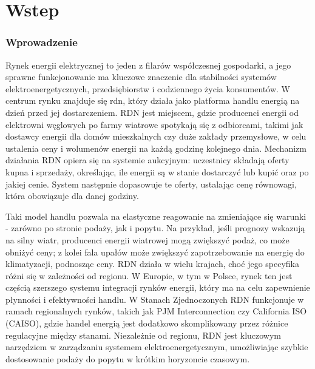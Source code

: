 \chapter{Wstep}

\subsection*{Wprowadzenie}
\label{ch:wprowadzenie}
Rynek energii elektrycznej to jeden z filarów współczesnej gospodarki, a jego sprawne funkcjonowanie ma kluczowe znaczenie dla stabilności systemów elektroenergetycznych, przedsiębiorstw i codziennego życia konsumentów. W centrum rynku znajduje się \gls{rdn}, który działa jako platforma handlu energią na dzień przed jej dostarczeniem. RDN jest miejscem, gdzie producenci energii od elektrowni węglowych po farmy wiatrowe spotykają się z odbiorcami, takimi jak dostawcy energii dla domów mieszkalnych czy duże zakłady przemysłowe, w celu ustalenia ceny i wolumenów energii na każdą godzinę kolejnego dnia. Mechanizm działania RDN opiera się na systemie aukcyjnym: uczestnicy składają oferty kupna i sprzedaży, określając, ile energii są w stanie dostarczyć lub kupić oraz po jakiej cenie. System następnie dopasowuje te oferty, ustalając cenę równowagi, która obowiązuje dla danej godziny.

Taki model handlu pozwala na elastyczne reagowanie na zmieniające się warunki - zarówno po stronie podaży, jak i popytu. Na przykład, jeśli prognozy wskazują na silny wiatr, producenci energii wiatrowej mogą zwiększyć podaż, co może obniżyć ceny; z kolei fala upałów może zwiększyć zapotrzebowanie na energię do klimatyzacji, podnosząc ceny. RDN działa w wielu krajach, choć jego specyfika różni się w zależności od regionu. W Europie, w tym w Polsce, rynek ten jest częścią szerszego systemu integracji rynków energii, który ma na celu zapewnienie płynności i efektywności handlu. W Stanach Zjednoczonych RDN funkcjonuje w ramach regionalnych rynków, takich jak PJM Interconnection czy California ISO (CAISO), gdzie handel energią jest dodatkowo skomplikowany przez różnice regulacyjne między stanami. Niezależnie od regionu, RDN jest kluczowym narzędziem w zarządzaniu systemem elektroenergetycznym, umożliwiając szybkie dostosowanie podaży do popytu w krótkim horyzoncie czasowym.


